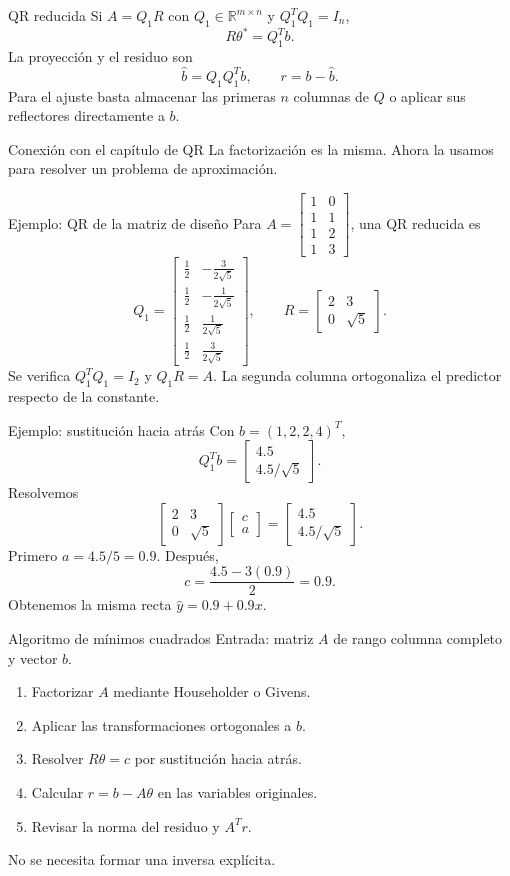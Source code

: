 \documentclass[aspectratio=169,12pt]{beamer}
\newcommand{\R}{\mathbb{R}}
\newcommand{\mat}[1]{\begin{bmatrix}#1\end{bmatrix}}
\begin{document}
\begin{frame}{QR reducida}
Si $A=Q_1R$ con $Q_1\in\R^{m\times n}$ y $Q_1^TQ_1=I_n$,
\[
R\theta^*=Q_1^Tb.
\]
La proyección y el residuo son
\[
\widehat b=Q_1Q_1^Tb,\qquad r=b-\widehat b.
\]
Para el ajuste basta almacenar las primeras $n$ columnas de $Q$ o aplicar
sus reflectores directamente a $b$.
\begin{block}{Conexión con el capítulo de QR}
La factorización es la misma. Ahora la usamos para resolver un problema de aproximación.
\end{block}
\end{frame}

\begin{frame}{Ejemplo: QR de la matriz de diseño}
Para $A=\mat{1&0\\1&1\\1&2\\1&3}$, una QR reducida es
\[
Q_1=\mat{
\frac12&-\frac{3}{2\sqrt5}\\
\frac12&-\frac{1}{2\sqrt5}\\
\frac12& \frac{1}{2\sqrt5}\\
\frac12& \frac{3}{2\sqrt5}},
\qquad R=\mat{2&3\\0&\sqrt5}.
\]
Se verifica $Q_1^TQ_1=I_2$ y $Q_1R=A$.
La segunda columna ortogonaliza el predictor respecto de la constante.
\end{frame}

\begin{frame}{Ejemplo: sustitución hacia atrás}
Con $b=(1,2,2,4)^T$,
\[
Q_1^Tb=\mat{4.5\\4.5/\sqrt5}.
\]
Resolvemos
\[
\mat{2&3\\0&\sqrt5}\mat{c\\a}
=\mat{4.5\\4.5/\sqrt5}.
\]
Primero $a=4.5/5=0.9$. Después,
\[
c=\frac{4.5-3(0.9)}2=0.9.
\]
Obtenemos la misma recta $\widehat y=0.9+0.9x$.
\end{frame}

\begin{frame}{Algoritmo de mínimos cuadrados}
Entrada: matriz $A$ de rango columna completo y vector $b$.
\begin{enumerate}
\item Factorizar $A$ mediante Householder o Givens.
\item Aplicar las transformaciones ortogonales a $b$.
\item Resolver $R\theta=c$ por sustitución hacia atrás.
\item Calcular $r=b-A\theta$ en las variables originales.
\item Revisar la norma del residuo y $A^Tr$.
\end{enumerate}
No se necesita formar una inversa explícita.
\end{frame}
\end{document}
